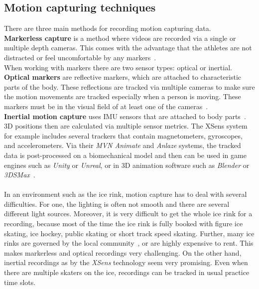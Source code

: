 \subsection{Motion capturing techniques}
\label{motioncapture}
There are three main methods for recording motion capturing data.\\
\textbf{Markerless capture} is a method where videos are recorded via a single or multiple depth cameras.
This comes with the advantage that the athletes are not distracted or feel uncomfortable by any
markers~\cite{mocapopticalradical, mocapopticalcapture, mocapmarkerless3dscans}.\\
When working with markers there are two sensor types: optical or inertial.
\textbf{Optical markers} are reflective markers, which are attached to characteristic parts of the body.
These reflections are tracked via multiple cameras to make sure the motion movements are tracked especially when a
person is moving. These markers must be in the visual field of at least one of the cameras~\cite{mocapoptical}.\\
\textbf{Inertial motion capture} uses \gls{IMU} sensors that are attached to body parts~\cite{xsens, mocapinterialneuron}.
3D positions then are calculated via multiple sensor metrics.
The XSens system for example includes several trackers that contain magnetometers, gyroscopes, and accelerometers.
Via their \textit{MVN Animate} and \textit{Anlaze} systems, the tracked data is post-processed on a biomechanical model
and then can be used in game engines such as \textit{Unity} or \textit{Unreal}, or in 3D animation software such as \textit{Blender} or
\textit{3DSMax}~\cite{xsensabout}.
\\\mbox{}\\
In an environment such as the ice rink, motion capture has to deal with several difficulties.
For one, the lighting is often not smooth and there are several different light sources.
Moreover, it is very difficult to get the whole ice rink for a recording, because most of the time the ice rink is fully
booked with figure ice skating, ice hockey, public skating or short track speed skating.
Further, many ice rinks are governed by the local community~\cite{stuttgarteiswelt}, or are highly expensive to rent.
This makes markerless and optical recordings very challenging.
On the other hand, inertial recordings as by the \textit{XSens} technology seem very promising.
Even when there are multiple skaters on the ice, recordings can be tracked in usual practice time slots.

